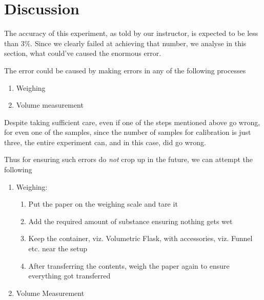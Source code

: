 \section{Discussion}
	The accuracy of this experiment, as told by our instructor, is expected to be less than $3\%$. Since we clearly failed at achieving that number, we analyse in this section, what could've caused the enormous error.
	\par
	The error could be caused by making errors in any of the following processes
	\begin{enumerate}
		\item Weighing
		\item Volume measurement
	\end{enumerate}
	Despite taking sufficient care, even if one of the steps mentioned above go wrong, for even one of the samples, since the number of samples for calibration is just three, the entire experiment can, and in this case, did go wrong.
	\par
	Thus for ensuring such errors do \emph{not} crop up in the future, we can attempt the following
	\begin{enumerate}
		\item Weighing:
		\begin{enumerate}
			\item Put the paper on the weighing scale and tare it
			\item Add the required amount of substance ensuring nothing gets wet
			\item Keep the container, viz. Volumetric Flask, with accessories, viz. Funnel etc. near the setup
			\item After transferring the contents, weigh the paper again to ensure everything got transferred
		\end{enumerate}
		\item Volume Measurement
	\end{enumerate}
